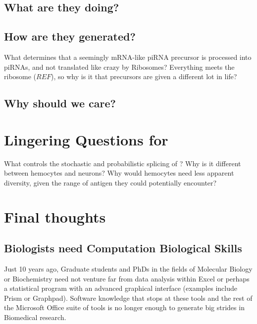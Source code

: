 {{  %

  \subsection{What are they doing?}


  \subsection{How are they generated?}


    What determines that a seemingly mRNA-like piRNA precursor is processed into piRNAs, and not translated like crazy by Ribosomes?  Everything meets the ribosome ($REF$), so why is it that precursors are given a different lot in life?

  \subsection{Why should we care?}

\section{Lingering Questions for \dscam{}}

  What controls the stochastic and probabilistic splicing of \dscam{}? Why is it different between hemocytes and neurons? Why would hemocytes need less apparent diversity, given the range of antigen they could potentially encounter?

\section{Final thoughts}


  \subsection{Biologists need Computation Biological Skills}\label{subsec: Biologists need Comp Skills}

    Just 10 years ago,  Graduate students and PhDs in the fields of Molecular Biology or Biochemistry need not venture far from data analysis within Excel or perhaps a statistical program with an advanced graphical interface (examples include Prism or Graphpad). Software knowledge that stops at these tools and the rest of the Microsoft Office suite of tools is no longer enough to generate big strides in Biomedical research.

}}
